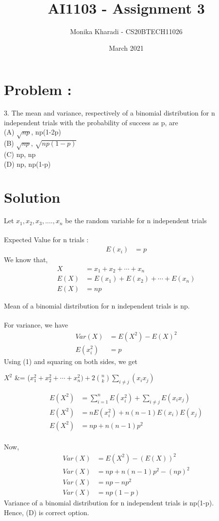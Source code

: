 \documentclass[journal,12pt,two column]{IEEEtran}
\title{AI1103 - Assignment 3}
\author{Monika Kharadi - CS20BTECH11026}
\date{March 2021}
\begin{document}
\maketitle
\section*{\large\textbf{Problem :}}
3. The mean and variance, respectively of a binomial distribution for n independent trials with the probability of success as p, are \\
(A) $\sqrt{np}$, np(1-2p)\\
(B) $\sqrt{np}$, $\sqrt{np(1-p)}$\\
(C) np, np \\
(D) np, np(1-p)
\section*{\large\textbf{Solution}}
Let $x_1,x_2,x_3,....,x_n$ be the random variable for n independent trials \\ \\
Expected Value for n trials : 
\begin{align}
E(x_i) &= p \nonumber
\end{align}
We know that,
\begin{align}
X &= x_1 + x_2 + \cdots + x_n \\
E(X) &= E(x_1) + E(x_2) + \cdots + E(x_n) \nonumber\\
E(X) &= np 
\end{align}

Mean of a binomial distribution for n independent trials is np.\\ \\
For variance, we have 
\begin{align}
    Var(X) &= E(X^2) - E(X)^2 \\
     E(x_i ^2) &= p
\end{align}
Using (1) and squaring on both sides, we get
\begin{center}
$X^2$ &= ($x_1 ^2 + x_2 ^2 + \cdots + x_n ^2) + 2{n\choose k}\sum_{i \neq j}(x_i x_j)$ \end{center}
\begin{align}
E (X^2) &= \sum_{i=1}^n E (x_i^2) + \sum_{i \neq j} E(x_i x_j) \nonumber \\
E(X^2) &= nE(x_i ^2) + n(n-1)E(x_i)E(x_j)\nonumber \\
E(X^2) &= np + n(n-1)p^2
\end{align}
\\ Now,
\begin{align}
 Var(X) &= E(X^2) - (E(X))^2 \nonumber\\  
 Var(X) &= np+n(n-1)p^2 -(np)^2\nonumber\\
 Var(X) &= np-np^2\nonumber\\
 Var(X) &= np(1-p)
\end{align}
Variance of a binomial distribution for n independent trials is np(1-p).\\
Hence, (D) is correct option.
\end{document}
